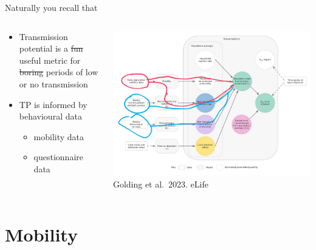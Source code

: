 \documentclass[
  ignorenonframetext,
  aspectratio=149,
]{beamer}
\providecommand{\tightlist}{%
  \setlength{\itemsep}{0pt}\setlength{\parskip}{0pt}}\usepackage{longtable,booktabs,array}
\begin{document}
\begin{frame}{Naturally you recall that}
\label{naturally-you-recall-that-1}
\begin{columns}[T]
\begin{column}{0.4\textwidth}
\begin{itemize}
\tightlist
\item
  Transmission potential is a \st{fun} useful metric for \st{boring}
  periods of low or no transmission
\item
  TP is informed by behavioural data

  \begin{itemize}
  \tightlist
  \item
    mobility data
  \item
    questionnaire data
  \end{itemize}
\end{itemize}
\end{column}

\begin{column}{0.7\textwidth}
\includegraphics{images/tp_model_schema_drawn_on.jpg} Golding et
al.~2023. eLife
\end{column}
\end{columns}
\end{frame}

\section{Mobility}\label{mobility}
\end{document}
